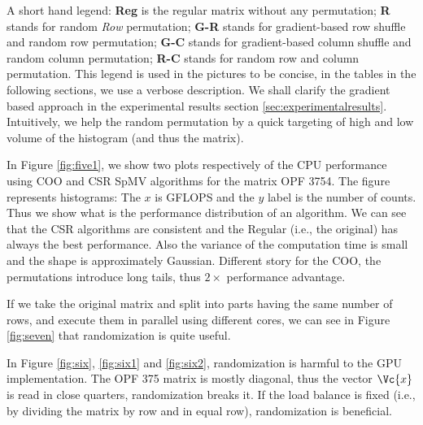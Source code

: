 \documentclass[manuscript,screen]{acmart}
\begin{document}
A short hand legend: {\bf Reg} is the regular matrix without any
permutation; {\bf R} stands for random {\em Row} permutation; {\bf
  G-R} stands for gradient-based row shuffle and random row
permutation; {\bf G-C} stands for gradient-based column shuffle and
random column permutation; {\bf R-C} stands for random row and column
permutation.  This legend is used in the pictures to be concise, in
the tables in the following sections, we use a verbose description. We
shall clarify the gradient based approach in the experimental results
section \ref{sec:experimentalresults}. Intuitively, we help the random
permutation by a quick targeting of high and low volume of the
histogram (and thus the matrix).


In Figure \ref{fig:five1}, we show two plots respectively of the CPU
performance using COO and CSR SpMV algorithms for the matrix OPF
3754. The figure represents histograms: The $x$ is GFLOPS and the $y$
label is the number of counts. Thus we show what is the performance
distribution of an algorithm.  We can see that the CSR algorithms are
consistent and the Regular (i.e., the original) has always the best
performance. Also the variance of the computation time is small and
the shape is approximately Gaussian.  Different story for the COO, the
permutations introduce long tails, thus $2\times$ performance
advantage.

If we take the original matrix and split into parts having the same
number of rows, and execute them in parallel using different cores, we
can see in Figure \ref{fig:seven} that randomization is quite useful.


In Figure \ref{fig:six}, \ref{fig:six1} and \ref{fig:six2},
randomization is harmful to the GPU implementation. The OPF 375 matrix
is mostly diagonal, thus the vector $\Vc{x}$ is read in close
quarters, randomization breaks it.  If the load balance is fixed
(i.e., by dividing the matrix by row and in equal row), randomization
is beneficial.

\end{document}
